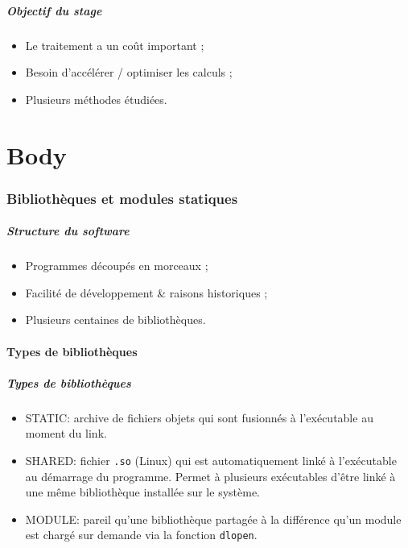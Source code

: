 \documentclass{beamer}
\begin{document}
\begin{frame}
    \frametitle{Objectif du stage}

    \begin{itemize}
        \item Le traitement a un coût important ;
        \item Besoin d'accélérer / optimiser les calculs ;
        \item Plusieurs méthodes étudiées.
    \end{itemize}
\end{frame}


\part{Body}
\begin{frame}
    \tableofcontents
\end{frame}

\section{Bibliothèques et modules statiques}

\begin{frame}
    \tableofcontents[currentsection]
\end{frame}

\begin{frame}[fragile]
    \frametitle{Structure du software}

    \begin{itemize}
        \item Programmes découpés en morceaux ;
        \item Facilité de développement \& raisons historiques ;
        \item Plusieurs centaines de bibliothèques.
    \end{itemize}
\end{frame}

\subsection{Types de bibliothèques}

\begin{frame}[fragile]
    \frametitle{Types de bibliothèques}

    \begin{itemize}
        \item STATIC: archive de fichiers objets qui sont fusionnés à l'exécutable au moment du link.
        \item SHARED: fichier \verb'.so' (Linux) qui est automatiquement linké à l'exécutable au démarrage du programme.
              Permet à plusieurs exécutables d'être linké à une même bibliothèque installée sur le système.
        \item MODULE: pareil qu'une bibliothèque partagée à la différence qu'un module est chargé sur demande via la fonction \verb'dlopen'.
    \end{itemize}
\end{frame}
\end{document}
